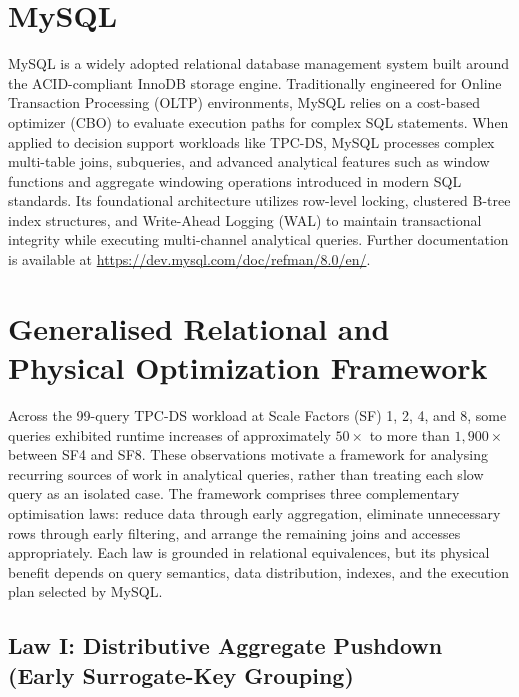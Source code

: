 \documentclass{ULBreport}
\begin{document}
\section{MySQL}

MySQL is a widely adopted relational database management system built around the ACID-compliant InnoDB storage engine. Traditionally engineered for Online Transaction Processing (OLTP) environments, MySQL relies on a cost-based optimizer (CBO) to evaluate execution paths for complex SQL statements. When applied to decision support workloads like TPC-DS, MySQL processes complex multi-table joins, subqueries, and advanced analytical features such as window functions and aggregate windowing operations introduced in modern SQL standards. Its foundational architecture utilizes row-level locking, clustered B-tree index structures, and Write-Ahead Logging (WAL) to maintain transactional integrity while executing multi-channel analytical queries. Further documentation is available at \url{https://dev.mysql.com/doc/refman/8.0/en/}.

\section{Generalised Relational and Physical Optimization Framework}

Across the 99-query TPC-DS workload at Scale Factors (SF) 1, 2, 4, and 8, some queries exhibited runtime increases of approximately $50\times$ to more than $1{,}900\times$ between SF4 and SF8. These observations motivate a framework for analysing recurring sources of work in analytical queries, rather than treating each slow query as an isolated case. The framework comprises three complementary optimisation laws: reduce data through early aggregation, eliminate unnecessary rows through early filtering, and arrange the remaining joins and accesses appropriately. Each law is grounded in relational equivalences, but its physical benefit depends on query semantics, data distribution, indexes, and the execution plan selected by MySQL.

\subsection{Law I: Distributive Aggregate Pushdown (Early Surrogate-Key Grouping)}
\end{document}
